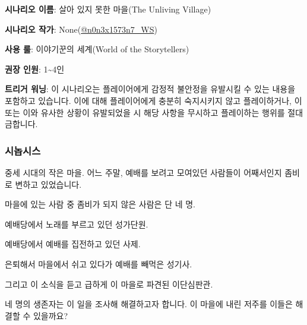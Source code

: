 \documentclass{report}
\begin{document}
	\textbf{시나리오 이름}: 살아 있지 못한 마을(The Unliving Village)
	
	\textbf{시나리오 작가}: None(\href{https://www.twitter.com/n0n3x1573n7_WS}{@n0n3x1573n7\_WS})
	
	\textbf{사용 룰}: 이야기꾼의 세계(World of the Storytellers)
	
	\textbf{권장 인원}: 1\textasciitilde4인
	
	\textbf{트리거 워닝}: 이 시나리오는 플레이어에게 감정적 불안정을 유발시킬 수 있는 내용을 포함하고 있습니다. 이에 대해 플레이어에게 충분히 숙지시키지 않고 플레이하거나, 이 또는 이와 유사한 상황이 유발되었을 시 해당 사항을 무시하고 플레이하는 행위를 절대 금합니다.
	
	\subsubsection*{시놉시스}
	
	중세 시대의 작은 마을. 어느 주말, 예배를 보려고 모여있던 사람들이 어째서인지 좀비로 변하고 있었습니다.
	
	마을에 있는 사람 중 좀비가 되지 않은 사람은 단 네 명.
	
	예배당에서 노래를 부르고 있던 성가단원.
	
	예배당에서 예배를 집전하고 있던 사제.
	
	은퇴해서 마을에서 쉬고 있다가 예배를 빼먹은 성기사.
	
	그리고 이 소식을 듣고 급하게 이 마을로 파견된 이단심판관.
	
	네 명의 생존자는 이 일을 조사해 해결하고자 합니다. 이 마을에 내린 저주를 이들은 해결할 수 있을까요?
\end{document}
